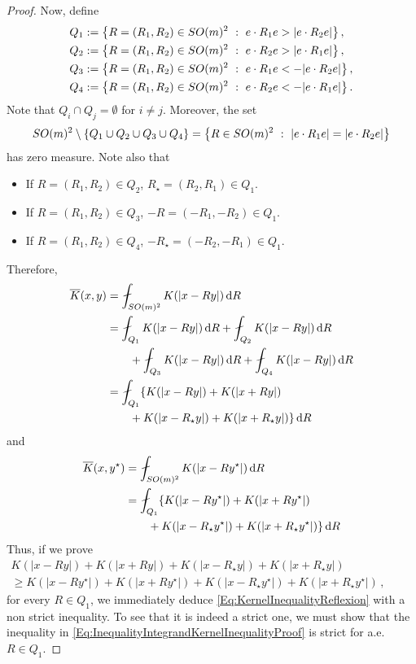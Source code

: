 \begin{proof}
	Now, define
	\begin{align*}
	Q_1 &:= \left \{ R = (R_1,R_2) \in SO(m)^2 \ : \ e\cdot R_1 e > |e\cdot R_2 e| \right \},\\
	Q_2 &:= \left \{ R = (R_1,R_2) \in SO(m)^2 \ : \ e\cdot R_2 e > |e\cdot R_1 e| \right \},\\
	Q_3 &:= \left \{ R = (R_1,R_2) \in SO(m)^2 \ : \ e\cdot R_1 e < -|e\cdot R_2 e| \right \},\\
	Q_4 &:= \left \{ R = (R_1,R_2) \in SO(m)^2 \ : \ e\cdot R_2 e < - |e\cdot R_1 e| \right \}.
	\end{align*}
	Note that $Q_i \cap Q_j = \emptyset$ for $i\neq j$. Moreover, the set
	$$
	SO(m)^2 \setminus \{Q_1 \cup Q_2 \cup Q_3 \cup Q_4\} = \left \{ R\in SO(m)^2 \ : \ |e\cdot R_1 e| = |e\cdot R_2 e| \right \}
	$$
	has zero measure. Note also that
	\begin{itemize}
		\item If $R = (R_1, R_2)\in Q_2$, $R_\star = (R_2, R_1) \in Q_1$.
		\item If $R = (R_1, R_2)\in Q_3$, $-R = (-R_1, -R_2) \in Q_1$.
		\item If $R = (R_1, R_2)\in Q_4$, $-R_\star = (-R_2, -R_1) \in Q_1$.
	\end{itemize}
	Therefore, 
	\begin{align*}
	\overline{K} (x, y) &= \average_{SO(m)^2} K(|x - R y|)\d R \\
	& = \average_{Q_1} K(|x - R y|)\d R + \average_{Q_2} K(|x - R y|)\d R \\
	& \quad \quad
	+ \average_{Q_3} K(|x - R y|)\d R + 
	\average_{Q_4} K(|x - R y|)\d R \\
	&= \average_{Q_1} \{K(|x - R y|) + K(|x + R y|) \\
	&\quad \quad + K(|x - R_\star y|) + K(|x + R_\star y|)\}\d R
	\end{align*}
	and 
    \begin{align*}
	\overline{K} (x, y^\star) &= \average_{SO(m)^2} K(|x - R y^\star|)\d R \\
	& = \average_{Q_1} \{K(|x - R y^\star|) + K(|x + R y^\star|) \\
	&\quad \quad + K(|x - R_\star y^\star|) + K(|x + R_\star y^\star|)\}\d R
	\end{align*}
    Thus, if we prove
	\begin{equation}
	\label{Eq:InequalityIntegrandKernelInequalityProof}
	\begin{split}
	K(|x - R y|) + K(|x + R y|) + K(|x - R_\star y|) + K(|x + R_\star y|) 
    \quad \quad \quad \quad \quad \quad \quad \quad
	 \\
    \geq
	K(|x - R y^\star|) + K(|x + R y^\star|)+K(|x - R_\star y^\star|) + K(|x + R_\star y^\star|)\,,
	\end{split}
	\end{equation}
	for every $R\in Q_1$, we immediately deduce \eqref{Eq:KernelInequalityReflexion} with a non strict inequality. To see that it is indeed a strict one, we must show that the inequality in \eqref{Eq:InequalityIntegrandKernelInequalityProof} is strict for a.e. $R \in Q_1$.
    

\end{proof}
